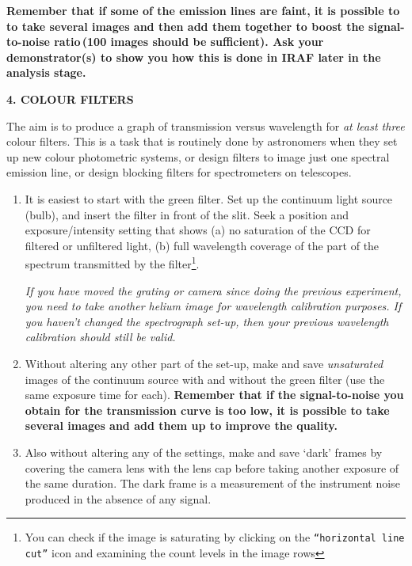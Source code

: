 \documentclass[12pt]{article}
\begin{document}
{\bf Remember that if some of the emission lines are faint, it is possible to to take several images and then add them together to boost the signal-to-noise ratio\,(100 images should be sufficient). Ask your demonstrator(s) to show you how this is done in IRAF later in the analysis stage.}

\newpage

{\bf 4. COLOUR FILTERS}

The aim is to produce a graph of transmission versus wavelength for {\sl at least three} colour filters. This is a task that is routinely done by astronomers when they set up new colour photometric systems, or design filters to image just one spectral emission line, or design blocking filters for spectrometers on telescopes.

\begin{enumerate}

\item It is easiest to start with the green filter. Set up the continuum light source (bulb), and insert the filter in front of the slit. Seek a position and exposure/intensity setting that shows (a) no saturation of the CCD for filtered or unfiltered light, (b) full wavelength coverage of the part of the spectrum transmitted by the filter\footnote{You can check if the image is saturating by clicking on the {\tt ``horizontal line cut''} icon and examining the count levels in the image rows}.

{\it If you have moved the grating or camera since doing the previous experiment, you need to take another helium image for wavelength calibration purposes. If you haven't changed the spectrograph set-up, then your previous wavelength calibration should still be valid.}

\item Without altering any other part of the set-up, make and save {\sl unsaturated} images of the continuum source with and without the green filter (use the same exposure time for each). {\bf Remember that if the signal-to-noise you obtain for the transmission curve is too low, it is possible to take several images and add them up to improve the quality.}

\item Also without altering any of the settings, make and save `dark' frames by covering the camera lens with the lens cap before taking another exposure of the same duration. The dark frame is a measurement of the instrument noise produced in the absence of any signal.

\end{enumerate}
\end{document}
